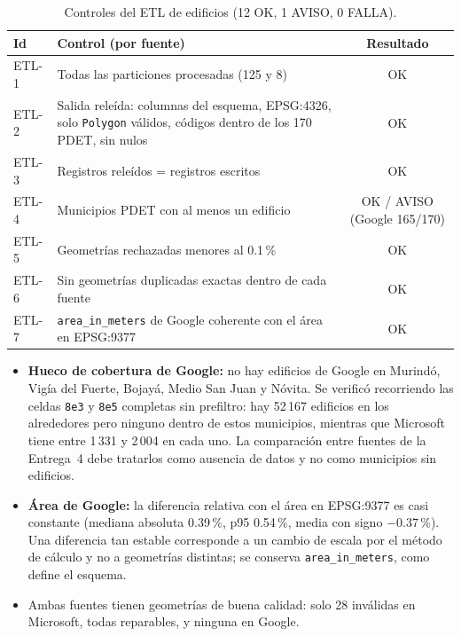 \begin{table}[H]
\centering
\small
{}
\begin{tabularx}{\textwidth}{l X c}
\toprule
\textbf{Id} & \textbf{Control (por fuente)} & \textbf{Resultado} \\
\midrule
ETL-1 & Todas las particiones procesadas (125 y 8) & OK \\
ETL-2 & Salida releída: columnas del esquema, EPSG:4326, solo \texttt{Polygon} válidos, códigos dentro de los 170 PDET, sin nulos & OK \\
ETL-3 & Registros releídos = registros escritos & OK \\
ETL-4 & Municipios PDET con al menos un edificio & OK / AVISO (Google 165/170) \\
ETL-5 & Geometrías rechazadas menores al 0.1\,\% & OK \\
ETL-6 & Sin geometrías duplicadas exactas dentro de cada fuente & OK \\
ETL-7 & \texttt{area\_in\_meters} de Google coherente con el área en EPSG:9377 & OK \\
\bottomrule
\end{tabularx}
\caption{Controles del ETL de edificios (12 OK, 1 AVISO, 0 FALLA).}
\label{tab:qc_etl}
\end{table}

\begin{itemize}
  \item \textbf{Hueco de cobertura de Google:} no hay edificios de Google en Murindó, Vigía del Fuerte, Bojayá, Medio San Juan y Nóvita. Se verificó recorriendo las celdas \texttt{8e3} y \texttt{8e5} completas sin prefiltro: hay 52\,167 edificios en los alrededores pero ninguno dentro de estos municipios, mientras que Microsoft tiene entre 1\,331 y 2\,004 en cada uno. La comparación entre fuentes de la Entrega~4 debe tratarlos como ausencia de datos y no como municipios sin edificios.
  \item \textbf{Área de Google:} la diferencia relativa con el área en EPSG:9377 es casi constante (mediana absoluta 0.39\,\%, p95 0.54\,\%, media con signo $-0.37$\,\%). Una diferencia tan estable corresponde a un cambio de escala por el método de cálculo y no a geometrías distintas; se conserva \texttt{area\_in\_meters}, como define el esquema.
  \item Ambas fuentes tienen geometrías de buena calidad: solo 28 inválidas en Microsoft, todas reparables, y ninguna en Google.
\end{itemize}
